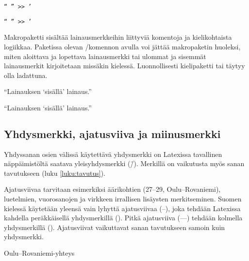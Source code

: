 
\begin{koodilohkosis}
  \texttt{`` '' >> '}
\end{koodilohkosis}

\begin{tulossis}
  \texttt{`` '' >> '}
\end{tulossis}

Makropaketti  sisältää
lainausmerkkeihin liittyviä komentoja ja kielikohtaista logiikkaa.
Paketissa olevan \-/komennon avulla voi jättää
makropaketin huoleksi, miten aloittava ja lopettava lainausmerkki tai
ulommat ja sisemmät lainausmerkit kirjoitetaan missäkin kielessä.
Luonnollisesti kielipaketti  tai 
täytyy olla ladattuna.


\begin{koodilohkosis}
  \usepackage{polyglossia} \setdefaultlanguage{finnish}
  \usepackage[autostyle=true]{csquotes}
  \enquote{Lainauksen \enquote{sisällä} lainaus.}
\end{koodilohkosis}

\begin{tulossis}
  \enquote{Lainauksen \enquote{sisällä} lainaus.}
\end{tulossis}

\subsection{Yhdysmerkki, ajatusviiva ja miinusmerkki}
\label{luku:yhdys_ajatus_miinus}

Yhdyssanan osien välissä käytettävä yhdysmerkki on Latexissa tavallinen
näppäimistöltä saatava yleis\-yh\-dys\-merk\-ki (\=/). Merkillä on
vaikutusta myös sanan tavutukseen (luku \ref{luku:tavutus}).

Ajatusviivaa tarvitaan esimerkiksi äärikohtien (27--29,
Oulu--Rova\-niemi), luetelmien, vuorosanojen ja virkkeen irrallisen
lisäysten merkitseminen. Suomen kielessä käytetään yleensä vain lyhyttä
ajatusviivaa \mbox{(--)}, joka tehdään Latexissa kahdella peräkkäisellä
yhdysmerkillä \mbox{(\koodi{--})}. Pitkä ajatusviiva \mbox{(---)}
tehdään kolmella yhdysmerkillä \mbox{(\koodi{---})}. Ajatusviivat
vaikuttavat sanan tavutukseen samoin kuin yhdysmerkki.


\begin{koodilohkosis}
  Oulu--Rovaniemi-yhteys
\end{koodilohkosis}

